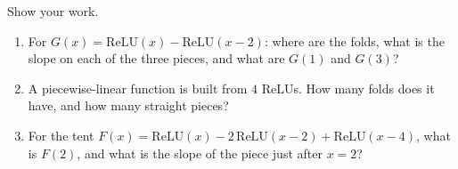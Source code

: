 \documentclass[10pt]{article}
\newcommand{\relu}{\mathrm{ReLU}}
\begin{document}
\begin{practicebox}
Show your work.
\begin{enumerate}[leftmargin=1.6em, itemsep=4pt]
  \item For $G(x)=\relu(x)-\relu(x-2)$: where are the folds, what is the slope on each of the three pieces, and what are $G(1)$ and $G(3)$? \writeline
  \item A piecewise-linear function is built from $4$ ReLUs. How many folds does it have, and how many straight pieces? \writeline
  \item For the tent $F(x)=\relu(x)-2\,\relu(x-2)+\relu(x-4)$, what is $F(2)$, and what is the slope of the piece just after $x=2$? \writeline
\end{enumerate}
\end{practicebox}
\end{document}
